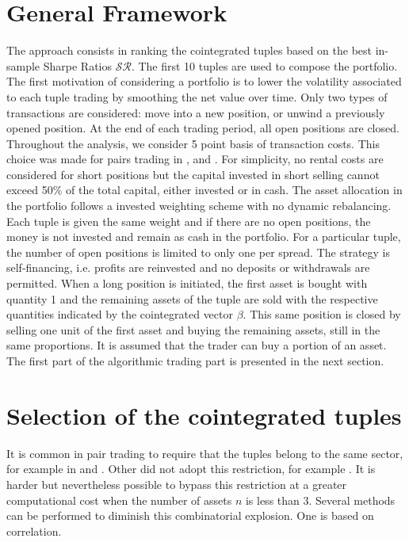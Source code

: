 \documentclass[11pt,a4,twosided,singlespacing,titlepagenumber=on]{scrreprt}
\numberwithin{equation}{chapter} %
\theoremstyle{remark}
\begin{document}
\section{General Framework}

The approach consists in ranking the cointegrated tuples based on the best in-sample Sharpe Ratios $\mathcal{SR}$. The first 10 tuples are used to compose the portfolio. The first motivation of considering a portfolio is to lower the volatility associated to each tuple trading by smoothing the net value over time. Only two types of transactions are considered: move into a new position, or unwind a previously opened position. At the end of each trading period, all open positions are closed. Throughout the analysis, we consider 5 point basis of transaction costs. This choice was made for pairs trading in \cite{dunis2010}, \cite{dunis2005} and \cite{alexander2002}. For simplicity, no rental costs are considered for short positions but the capital invested in short selling cannot exceed 50\% of the total capital, either invested or in cash. The asset allocation in the portfolio follows a invested weighting scheme with no dynamic rebalancing. Each tuple is given the same weight and if there are no open positions, the money is not invested and remain as cash in the portfolio. For a particular tuple, the number of open positions is limited to only one per spread. The strategy is self-financing, i.e. profits are reinvested and no deposits or withdrawals are permitted. When a long position is initiated, the first asset is bought with quantity 1 and the remaining assets of the tuple are sold with the respective quantities indicated by the cointegrated vector $\beta$. This same position is closed by selling one unit of the first asset and buying the remaining assets, still in the same proportions. It is assumed that the trader can buy a portion of an asset. \\
The first part of the algorithmic trading part is presented in the next section.

\section{Selection of the cointegrated tuples}

It is common in pair trading to require that the tuples belong to the same sector, for example in \cite{chan2009} and \cite{dunis2010}. Other did not adopt this restriction, for example \cite{caldeira2013}. It is harder but nevertheless possible to bypass this restriction at a greater computational cost when the number of assets $n$ is less than 3. Several methods can be performed to diminish this combinatorial explosion. One is based on correlation. 
\end{document}
